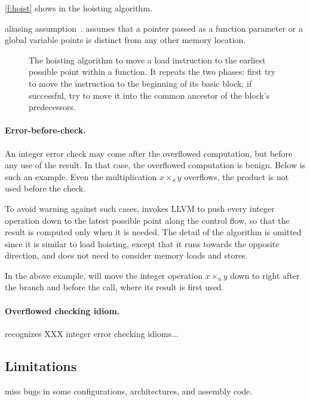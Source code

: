 \autoref{f:hoist} shows in the hoisting algorithm.

aliasing assumption~\cite{livshits:ipssa}.
\sys assumes that a pointer passed as a function parameter or a
global variable points is distinct from any other memory location.


\begin{figure}

\caption{The hoisting algorithm to move a load instruction to the
earliest possible point within a function.  It repeats the two
phases: first try to move the instruction to the beginning of its
basic block; if successful, try to move it into the common ancestor
of the block's predecessors.}
\label{f:hoist}
\end{figure}

\paragraph{Error-before-check.}
An integer error check may come after the overflowed computation,
but before any use of the result.  In that case, the overflowed
computation is benign.  Below is such an example.  Even the
multiplication $x \times_u y$ overflows, the product  is
not used before the check.


To avoid warning against such cases, \sys invokes LLVM to push every
integer operation down to the latest possible point along the control
flow, so that the result is computed only when it is needed.  The
detail of the algorithm is omitted since it is similar to load
hoisting, except that it runs towards the opposite direction, and
does not need to consider memory loads and stores.

In the above example, \sys will move the integer operation $x
\times_u y$ down to right after the  branch and before the
 call, where its result  is first used.

\paragraph{Overflowed checking idiom.}

\sys recognizes XXX integer error checking idioms...

\subsection{Limitations}

miss bugs in some configurations, architectures,
and assembly code.
